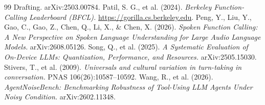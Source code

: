 \documentclass[11pt]{article}
\begin{document}
\begin{thebibliography}{99}
{Drafting.} arXiv:2503.00784.
 Patil, S. G., et al. (2024). \emph{Berkeley
Function-Calling Leaderboard (BFCL).} \url{https://gorilla.cs.berkeley.edu}.
 Peng, Y., Liu, Y., Gao, C., Gao, Z., Chen, Q.,
Li, X., \& Chen, X. (2026). \emph{Spoken Function Calling: A New Perspective on Spoken
Language Understanding for Large Audio Language Models.} arXiv:2608.05126.
 Song, Q., et al. (2025). \emph{A Systematic
Evaluation of On-Device LLMs: Quantization, Performance, and Resources.}
arXiv:2505.15030.
 Stivers, T., et al. (2009). \emph{Universals
and cultural variation in turn-taking in conversation.} PNAS 106(26):10587--10592.
 Wang, R., et al. (2026). \emph{AgentNoiseBench:
Benchmarking Robustness of Tool-Using LLM Agents Under Noisy Condition.}
arXiv:2602.11348.
\end{thebibliography}
\end{document}

